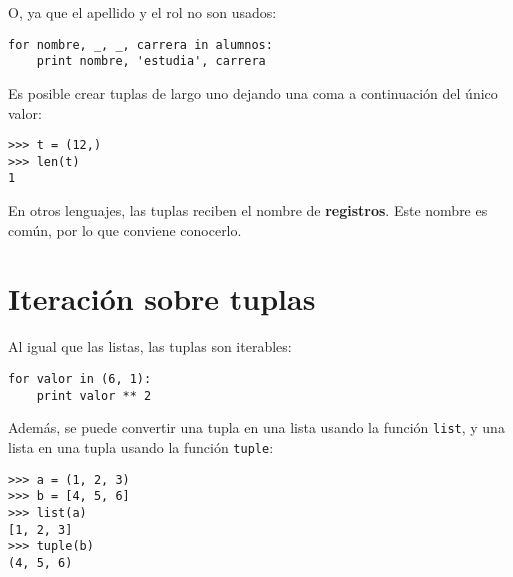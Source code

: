 O, ya que el apellido y el rol no son usados:

\begin{lstlisting}
for nombre, _, _, carrera in alumnos:
    print nombre, 'estudia', carrera
\end{lstlisting}

Es posible crear tuplas de largo uno dejando una coma a continuación del
único valor:

\begin{lstlisting}
>>> t = (12,)
>>> len(t)
1
\end{lstlisting}

En otros lenguajes, las tuplas reciben el nombre de \textbf{registros}.
Este nombre es común, por lo que conviene conocerlo.

\section{Iteración sobre tuplas}

Al igual que las listas, las tuplas son iterables:

\begin{lstlisting}
for valor in (6, 1):
    print valor ** 2
\end{lstlisting}

Además, se puede convertir una tupla en una lista usando la función
\lstinline!list!, y una lista en una tupla usando la función
\lstinline!tuple!:

\begin{lstlisting}
>>> a = (1, 2, 3)
>>> b = [4, 5, 6]
>>> list(a)
[1, 2, 3]
>>> tuple(b)
(4, 5, 6)
\end{lstlisting}

